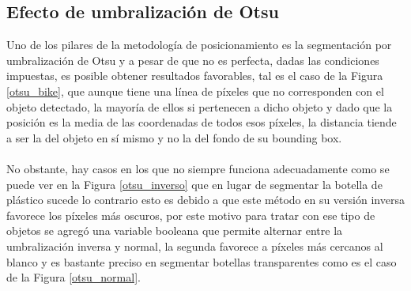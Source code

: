 \subsection{Efecto de umbralización de Otsu}
Uno de los pilares de la metodología de posicionamiento es la segmentación por umbralización de Otsu y a pesar de que no es perfecta, dadas las condiciones impuestas, es posible obtener resultados favorables, tal es el caso de la Figura \ref{otsu_bike}, que aunque tiene una línea de píxeles que no corresponden con el objeto detectado, la mayoría de ellos si pertenecen a dicho objeto y dado que la posición es la media de las coordenadas de todos esos píxeles, la distancia tiende a ser la del objeto en sí mismo y no la del fondo de su bounding box. 
\\
\\
No obstante, hay casos en los que no siempre funciona adecuadamente como se puede ver en la Figura \ref{otsu_inverso} que en lugar de segmentar la botella de plástico sucede lo contrario esto es debido a que este método en su versión inversa favorece los píxeles más oscuros, por este motivo para tratar con ese tipo de objetos se agregó una variable booleana que permite alternar entre la umbralización inversa y normal, la segunda favorece a píxeles más cercanos al blanco y es bastante preciso en segmentar botellas transparentes como es el caso de la Figura \ref{otsu_normal}.
